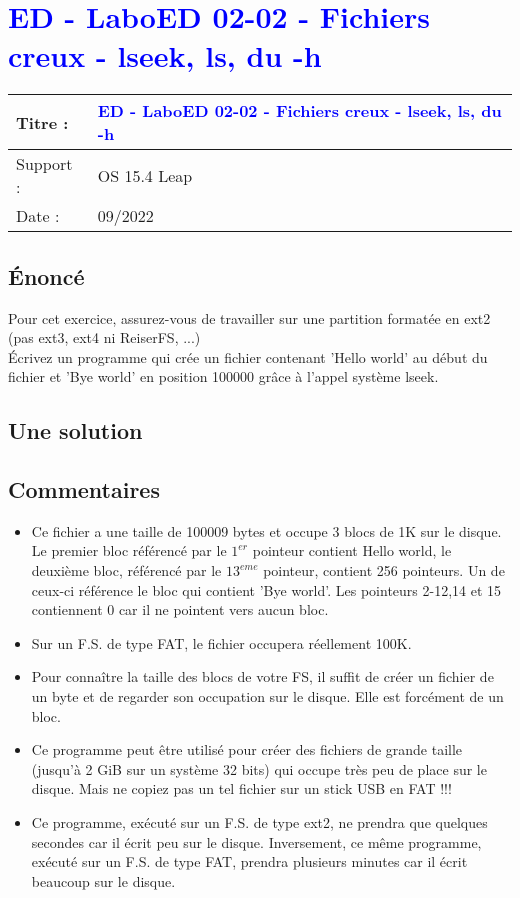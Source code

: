 \lstset{language=c}
\renewcommand{\titre}{\textcolor{blue}{ ED - LaboED 02-02 - Fichiers creux - lseek, ls, du -h}}

\lhead{ \titre }
\section{{\titre} }

\begin{tabular}{|l|l|}
\hline
Titre : 	& \titre \\\hline
Support : 	& OS 15.4 Leap\\\hline
Date :		& 09/2022 \\\hline
\end{tabular}

\subsection{Énoncé}

Pour cet exercice, assurez-vous de travailler sur une partition formatée en ext2 (pas ext3, ext4 ni ReiserFS, ...)\\
Écrivez un programme qui crée un fichier contenant 'Hello world' au début du fichier et 'Bye world' en position 100000 grâce à l'appel système lseek.

\subsection{Une solution}



\subsection{Commentaires}

\begin{itemize}
\item Ce fichier a une taille de 100009 bytes et occupe 3 blocs de 1K sur le disque. Le premier bloc référencé par le $1^{er}$ pointeur contient Hello world, le deuxième bloc, référencé par le $13^{eme}$ pointeur, contient 256 pointeurs. Un de ceux-ci référence le bloc qui contient 'Bye world'. Les pointeurs 2-12,14 et 15 contiennent 0 car il ne pointent vers aucun bloc.
\item Sur un F.S. de type FAT, le fichier occupera réellement 100K.
\item Pour connaître la taille des blocs de votre FS, il suffit de créer un fichier de un byte et de regarder son occupation sur le disque. Elle est forcément de un bloc.
\item Ce programme peut être utilisé pour créer des fichiers de grande taille (jusqu'à 2 GiB sur un système 32 bits) qui occupe très peu de place sur le disque. Mais ne copiez pas un tel fichier sur un stick USB en FAT !!!
\item Ce programme, exécuté sur un F.S. de type ext2, ne prendra que quelques secondes car il écrit peu sur le disque. Inversement, ce même programme, exécuté sur un F.S. de type FAT, prendra plusieurs minutes car il écrit beaucoup sur le disque.
\end{itemize}

